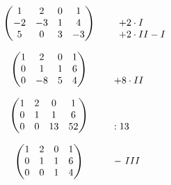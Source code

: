 \documentclass[main.tex]{subfiles}
\begin{document}
\begin{equation*}
    \begin{array}{ c l }
    \begin{array}{l}
        \begin{pmatrix}
        1 & 2 & 0 & 1\\
        -2 & -3 & 1 & 4\\
        5 & 0 & 3 & -3
        \end{pmatrix}
    \end{array} & \begin{array}{l}
    \begin{array}{ l }
    \\
    +2\cdotp I\\
    +2\cdotp II-I
    \end{array}
    \end{array}\vspace{0.4cm}\\
    \begin{pmatrix}
    1 & 2 & 0 & 1\\
    0 & 1 & 1 & 6\\
    0 & -8 & 5 & 4
    \end{pmatrix} & \begin{array}{ l }
    \\
    \\
    +8\cdotp II
    \end{array}\vspace{0.4cm}\\
    \begin{pmatrix}
    1 & 2 & 0 & 1\\
    0 & 1 & 1 & 6\\
    0 & 0 & 13 & 52
    \end{pmatrix} & \begin{array}{ l }
    \\
    \\
    :13
    \end{array}\vspace{0.4cm}\\
    \begin{pmatrix}
    1 & 2 & 0 & 1\\
    0 & 1 & 1 & 6\\
    0 & 0 & 1 & 4
    \end{pmatrix} & \begin{array}{ l }
    \\
    -\ III\\
    \\
    \end{array}\vspace{0.4cm}\\

\end{array}
\end{equation*}
\end{document}
